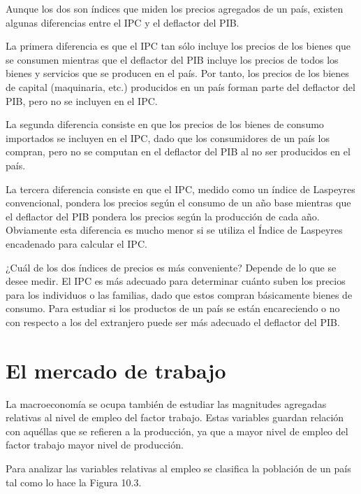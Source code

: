 \documentclass[
]{krantz}
\begin{document}
Aunque los dos son índices que miden los precios agregados de un país, existen algunas diferencias entre el IPC y el deflactor del PIB.

La primera diferencia es que el IPC tan sólo incluye los precios de los bienes que se consumen mientras que el deflactor del PIB incluye los precios de todos los bienes y servicios que se producen en el país. Por tanto, los precios de los bienes de capital (maquinaria, etc.) producidos en un país forman parte del deflactor del PIB, pero no se incluyen en el IPC.

La segunda diferencia consiste en que los precios de los bienes de consumo importados se incluyen en el IPC, dado que los consumidores de un país los compran, pero no se computan en el deflactor del PIB al no ser producidos en el país.

La tercera diferencia consiste en que el IPC, medido como un índice de Laspeyres convencional, pondera los precios según el consumo de un año base mientras que el deflactor del PIB pondera los precios según la producción de cada año. Obviamente esta diferencia es mucho menor si se utiliza el Índice de Laspeyres encadenado para calcular el IPC.

¿Cuál de los dos índices de precios es más conveniente? Depende de lo que se desee medir. El IPC es más adecuado para determinar cuánto suben los precios para los individuos o las familias, dado que estos compran básicamente bienes de consumo. Para estudiar si los productos de un país se están encareciendo o no con respecto a los del extranjero puede ser más adecuado el deflactor del PIB.

\hypertarget{el-mercado-de-trabajo}{%
\section{El mercado de trabajo}\label{el-mercado-de-trabajo}}

La macroeconomía se ocupa también de estudiar las magnitudes agregadas relativas al nivel de empleo del factor trabajo. Estas variables guardan relación con aquéllas que se refieren a la producción, ya que a mayor nivel de empleo del factor trabajo mayor nivel de producción.

Para analizar las variables relativas al empleo se clasifica la población de un país tal como lo hace la Figura 10.3.
\end{document}
